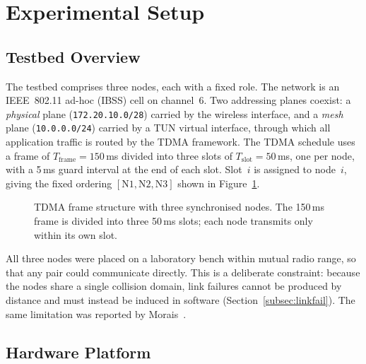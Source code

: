 \section{Experimental Setup}
\label{sec:setup}

\subsection{Testbed Overview}
\label{subsec:overview}

The testbed comprises three nodes, each with a fixed role. The network is an
IEEE~802.11 ad-hoc (IBSS) cell on channel~6. Two addressing planes coexist:
a \emph{physical} plane (\texttt{172.20.10.0/28}) carried by the wireless
interface, and a \emph{mesh} plane (\texttt{10.0.0.0/24}) carried by a TUN
virtual interface, through which all application traffic is routed by the
TDMA framework. The TDMA schedule uses a frame of $T_{\mathrm{frame}} =
150$\,ms divided into three slots of $T_{\mathrm{slot}} = 50$\,ms, one per
node, with a 5\,ms guard interval at the end of each slot. Slot~$i$ is
assigned to node~$i$, giving the fixed ordering
$[\text{N1}, \text{N2}, \text{N3}]$ shown in Figure~\ref{fig:frame}.

\vspace{0.4cm}
\begin{figure}[H]
\centering
\fbox{\parbox{0.95\textwidth}{\centering\vspace{1.4cm}
N1 slot $[0,50)$\,ms \qquad N2 slot $[50,100)$\,ms \qquad N3 slot $[100,150)$\,ms
\vspace{1.4cm}}}
\caption{TDMA frame structure with three synchronised nodes. The 150\,ms frame
is divided into three 50\,ms slots; each node transmits only within its own
slot.}
\label{fig:frame}
\end{figure}
\vspace{0.5cm}

All three nodes were placed on a laboratory bench within mutual radio range,
so that any pair could communicate directly. This is a deliberate constraint:
because the nodes share a single collision domain, link failures cannot be
produced by distance and must instead be induced in software
(Section~\ref{subsec:linkfail}). The same limitation was reported by
Morais~\cite{morais2024synchronization}.

\subsection{Hardware Platform}
\label{subsec:hardware}

